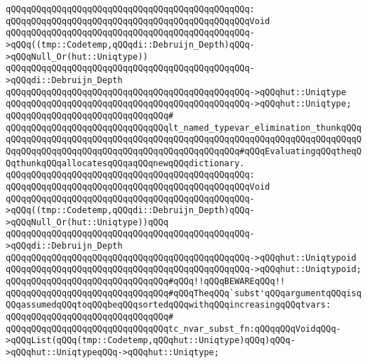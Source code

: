 \verb|qQQqqQQqqQQqqQQqqQQqqQQqqQQqqQQqqQQqqQQqqQQqqQQq:|\newline
\verb|qQQqqQQqqQQqqQQqqQQqqQQqqQQqqQQqqQQqqQQqqQQqqQQqVoid|\newline
\verb|qQQqqQQqqQQqqQQqqQQqqQQqqQQqqQQqqQQqqQQqqQQqqQQq->qQQq((tmp::Codetemp,qQQqdi::Debruijn_Depth)qQQq->qQQqNull_Or(hut::Uniqtype))|\newline
\verb|qQQqqQQqqQQqqQQqqQQqqQQqqQQqqQQqqQQqqQQqqQQqqQQq->qQQqdi::Debruijn_Depth|\newline
\verb|qQQqqQQqqQQqqQQqqQQqqQQqqQQqqQQqqQQqqQQqqQQqqQQq->qQQqhut::Uniqtype|\newline
\verb|qQQqqQQqqQQqqQQqqQQqqQQqqQQqqQQqqQQqqQQqqQQqqQQq->qQQqhut::Uniqtype;|\newline
\verb|qQQqqQQqqQQqqQQqqQQqqQQqqQQqqQQq#|\newline
\verb|qQQqqQQqqQQqqQQqqQQqqQQqqQQqqQQqlt_named_typevar_elimination_thunkqQQqqQQqqQQqqQQqqQQqqQQqqQQqqQQqqQQqqQQqqQQqqQQqqQQqqQQqqQQqqQQqqQQqqQQqqQQqqQQqqQQqqQQqqQQqqQQqqQQqqQQqqQQqqQQqqQQqqQQq#qQQqEvaluatingqQQqtheqQQqthunkqQQqallocatesqQQqaqQQqnewqQQqdictionary.|\newline
\verb|qQQqqQQqqQQqqQQqqQQqqQQqqQQqqQQqqQQqqQQqqQQqqQQq:|\newline
\verb|qQQqqQQqqQQqqQQqqQQqqQQqqQQqqQQqqQQqqQQqqQQqqQQqVoid|\newline
\verb|qQQqqQQqqQQqqQQqqQQqqQQqqQQqqQQqqQQqqQQqqQQqqQQq->qQQq((tmp::Codetemp,qQQqdi::Debruijn_Depth)qQQq->qQQqNull_Or(hut::Uniqtype))qQQq|\newline
\verb|qQQqqQQqqQQqqQQqqQQqqQQqqQQqqQQqqQQqqQQqqQQqqQQq->qQQqdi::Debruijn_Depth|\newline
\verb|qQQqqQQqqQQqqQQqqQQqqQQqqQQqqQQqqQQqqQQqqQQqqQQq->qQQqhut::Uniqtypoid|\newline
\verb|qQQqqQQqqQQqqQQqqQQqqQQqqQQqqQQqqQQqqQQqqQQqqQQq->qQQqhut::Uniqtypoid;|\newline
\newline
\verb|qQQqqQQqqQQqqQQqqQQqqQQqqQQqqQQq#qQQq!!qQQqBEWAREqQQq!!|\newline
\verb|qQQqqQQqqQQqqQQqqQQqqQQqqQQqqQQq#qQQqTheqQQq`subst'qQQqargumentqQQqisqQQqassumedqQQqtoqQQqbeqQQqsortedqQQqwithqQQqincreasingqQQqtvars:|\newline
\verb|qQQqqQQqqQQqqQQqqQQqqQQqqQQqqQQq#|\newline
\verb|qQQqqQQqqQQqqQQqqQQqqQQqqQQqqQQqtc_nvar_subst_fn:qQQqqQQqVoidqQQq->qQQqList(qQQq(tmp::Codetemp,qQQqhut::Uniqtype)qQQq)qQQq->qQQqhut::UniqtypeqQQq->qQQqhut::Uniqtype;|\newline
